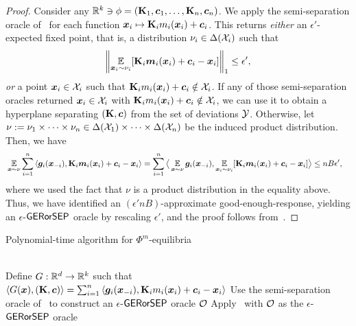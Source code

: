 \begin{proof}
Consider any $\mathbb R^{k} \ni \phi = ({\mathbf{K}}_1, \bm{c}_1, \dots, {\mathbf{K}}_n, \bm{c}_n)$. We apply the semi-separation oracle of~ for each function ${\bm{x}}_i \mapsto {\mathbf{K}}_i m_i({\bm{x}}_i) + \bm{c}_i$. This returns \emph{either} an $\epsilon'$-expected fixed point, that is, a distribution $\nu_i \in \Delta({\mathcal{X}}_i)$ such that $$\left\| \operatorname*{\mathbb E}_{{\bm{x}}_i \sim \nu_i} [ {\mathbf{K}}_i {\bm{m}}_i({\bm{x}}_i) + \bm{c}_i - {\bm{x}}_i ] \right\|_1 \leq \epsilon',$$
\emph{or} a point ${\bm{x}}_i \in {\mathcal{X}}_i$ such that ${\mathbf{K}}_i m_i({\bm{x}}_i) + \bm{c}_i \notin {\mathcal{X}}_i$. If any of those semi-separation oracles returned ${\bm{x}}_i \in {\mathcal{X}}_i$ with ${\mathbf{K}}_i m_i({\bm{x}}_i) + \bm{c}_i \notin {\mathcal{X}}_i$, we can use it to obtain a hyperplane separating $({\mathbf{K}}, \bm{c})$ from the set of deviations ${\mathcal{Y}}$. Otherwise, let $\nu := \nu_1 \times \dots \times \nu_n \in \Delta({\mathcal{X}}_1) \times \dots \times \Delta({\mathcal{X}}_n)$ be the induced product distribution. Then, we have
\begin{align}
    & \E_{\vx \sim \nu}\sum_{i = 1}^n \ip{\vg_i(\vx_{-i}), \mK_i \vm_i(\vx_i) + \cons_i - \vx_i} 
    = \sum_{i =1}^n  \big\langle\E_{\vx \sim \nu} \vg_i(\vx_{-i}), \E_{\vx_i \sim \nu_i}[\mK_i \vm_i(\vx_i) + \cons_i - \vx_i]\big\rangle \leq n B \eps', \label{eq:eqm-final}
\end{align}
where we used the fact that $\nu$ is a product distribution in the equality above. Thus, we have identified an $(\epsilon' n B)$-approximate good-enough-response, yielding an $\epsilon$-$\textsf{GERorSEP}$ oracle by rescaling $\epsilon'$, and the proof follows from~.
\end{proof}

\begin{algorithm}[!ht]
\caption{Polynomial-time algorithm for $\Phi^m$-equilibria}
\label{alg:main-eah}
\\
Define $G : \mathbb R^{d} \to \mathbb R^k$ such that $\langle G(\vx), (\mK, \cons) \rangle = \sum_{i =1}^n \ip{\vg_i(\vx_{-i}), \mK_i m_i(\vx_i) + \cons_i - \vx_i}$\;
Use the semi-separation oracle of~ to construct an $\epsilon$-$\textsf{GERorSEP}$ oracle ${\mathcal{O}}$\;
 Apply~ with ${\mathcal{O}}$ as the $\epsilon$-$\textsf{GERorSEP}$ oracle
\end{algorithm}

